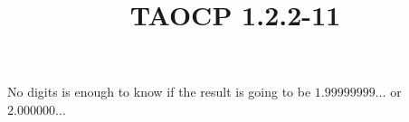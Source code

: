 \documentclass{article}
\title{TAOCP 1.2.2\mbox{-}11}
\begin{document}
\maketitle

No digits is enough to know if the result is going to be \( 1.99999999\ldots \) or \( 2.000000\ldots \)
\end{document}
